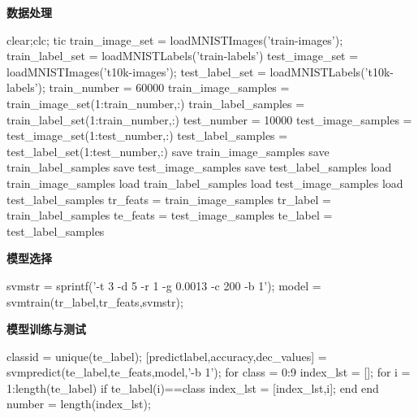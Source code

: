 \textcolor[rgb]{0.98,0.00,0.00}{\textbf{数据处理}}
\begin{python}
clear;clc;
tic
train_image_set = loadMNISTImages('train-images');
train_label_set = loadMNISTLabels('train-labels')
test_image_set = loadMNISTImages('t10k-images');
test_label_set = loadMNISTLabels('t10k-labels');
train_number = 60000
train_image_samples = train_image_set(1:train_number,:)
train_label_samples = train_label_set(1:train_number,:)
test_number = 10000
test_image_samples = test_image_set(1:test_number,:)
test_label_samples = test_label_set(1:test_number,:)
save train_image_samples
save train_label_samples
save test_image_samples
save test_label_samples
load train_image_samples
load train_label_samples
load test_image_samples
load test_label_samples
tr_feats = train_image_samples
tr_label = train_label_samples
te_feats = test_image_samples
te_label = test_label_samples
\end{python}

\textcolor[rgb]{0.98,0.00,0.00}{\textbf{模型选择}}
\begin{python}
svmstr = sprintf('-t 3 -d 5 -r 1 -g 0.0013 -c 200 -b 1');  
model = svmtrain(tr_label,tr_feats,svmstr);
\end{python}

\textcolor[rgb]{0.98,0.00,0.00}{\textbf{模型训练与测试}}
\begin{python}
classid = unique(te_label);
[predictlabel,accuracy,dec_values] = svmpredict(te_label,te_feats,model,'-b 1');
for class = 0:9
    index_lst = [];
    for i = 1:length(te_label)
        if te_label(i)==class
           index_lst = [index_lst,i];
        end
    end
    number = length(index_lst);
\end{python}

